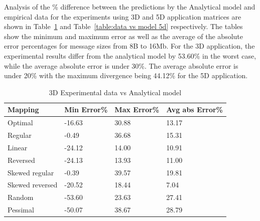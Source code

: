 \documentclass{acm_proc_article-sp}
\begin{document}
Analysis of the \% difference between the predictions by the Analytical model and empirical data
for the experiments using 3D and 5D application matrices are shown in Table~\ref{table:data vs model 3d}
and Table~\ref{table:data vs model 5d} respectively. The tables show the minimum and maximum error
as well as the average of the absolute error percentages for message sizes from 8B to 16Mb. For the
3D application, the experimental results differ from the analytical model by 53.60\% in the worst case,
while the average absolute error is under 30\%. The average absolute error is under 20\% with the
maximum divergence being 44.12\% for the 5D application.


\begin{table}
  \caption{3D Experimental data vs Analytical model
    \label{table:data vs model 3d}}
  {\footnotesize
    \begin{tabular}{ | l | l | l | p{1.5cm} |}
    \hline
    Mapping    &    Min Error\% &    Max Error\% & Avg abs Error\%\\ \hline
    Optimal    &         -16.63 &          30.88 &         13.17\\ \hline
    Regular    &          -0.49 &          36.68 &         15.31\\ \hline
    Linear     &         -24.12 &          14.00 &         10.91\\ \hline
    Reversed   &         -24.13 &          13.93 &         11.00\\ \hline
    Skewed regular &      -0.39 &          39.57 &         19.81\\ \hline
    Skewed reversed&     -20.52 &          18.44 &          7.04\\ \hline
    Random  &            -53.60 &          23.63 &         27.41\\ \hline
    Pessimal &           -50.07 &          38.67 &         28.79\\ \hline
    \hline
    \end{tabular}
  }
\end{table}
\end{document}
